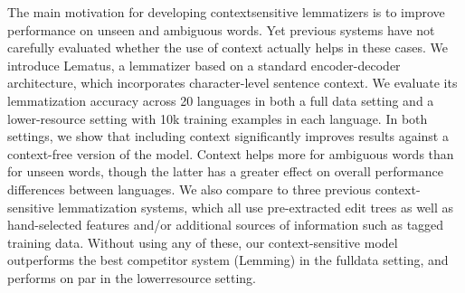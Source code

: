 The main motivation for developing contextsensitive lemmatizers is to improve performance on unseen and ambiguous words. Yet previous systems have not carefully evaluated whether the use of context actually helps in these cases. We introduce Lematus, a lemmatizer based on a standard encoder-decoder architecture, which incorporates character-level sentence context. We evaluate its lemmatization accuracy across 20 languages in both a full data setting and a lower-resource setting with 10k training examples in each language. In both settings, we show that including context significantly improves results against a context-free version of the model. Context helps more for ambiguous words than for unseen words, though the latter has a greater effect on overall performance differences between languages. We also compare to three previous context-sensitive lemmatization systems, which all use pre-extracted edit trees as well as hand-selected features and/or additional sources of information such as tagged training data. Without using any of these, our context-sensitive model outperforms the best competitor system (Lemming) in the fulldata setting, and performs on par in the lowerresource setting.
